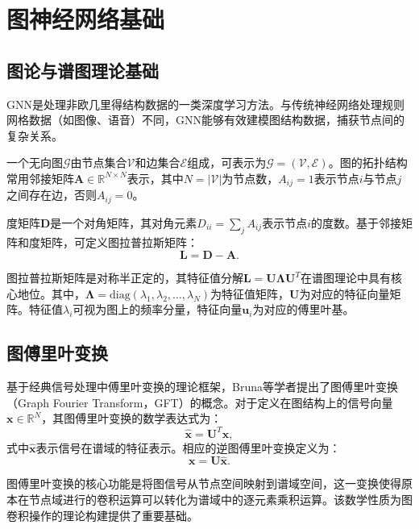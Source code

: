 \section{图神经网络基础}

\subsection{图论与谱图理论基础}

GNN是处理非欧几里得结构数据的一类深度学习方法。与传统神经网络处理规则网格数据（如图像、语音）不同，GNN能够有效建模图结构数据，捕获节点间的复杂关系\cite{chaptertwo6}。

一个无向图$\mathcal{G}$由节点集合$\mathcal{V}$和边集合$\mathcal{E}$组成，可表示为$\mathcal{G} = (\mathcal{V}, \mathcal{E})$。图的拓扑结构常用邻接矩阵$\mathbf{A} \in \mathbb{R}^{N \times N}$表示，其中$N = |\mathcal{V}|$为节点数，$A_{ij} = 1$表示节点$i$与节点$j$之间存在边，否则$A_{ij} = 0$。

度矩阵$\mathbf{D}$是一个对角矩阵，其对角元素$D_{ii} = \sum_j A_{ij}$表示节点$i$的度数。基于邻接矩阵和度矩阵，可定义图拉普拉斯矩阵\cite{chaptertwo7}：
\begin{equation}
\mathbf{L} = \mathbf{D} - \mathbf{A}.
\end{equation}

图拉普拉斯矩阵是对称半正定的，其特征值分解$\mathbf{L} = \mathbf{U}\boldsymbol{\Lambda}\mathbf{U}^T$在谱图理论中具有核心地位。其中，$\boldsymbol{\Lambda} = \text{diag}(\lambda_1, \lambda_2, \ldots, \lambda_N)$为特征值矩阵，$\mathbf{U}$为对应的特征向量矩阵。特征值$\lambda_i$可视为图上的频率分量，特征向量$\mathbf{u}_i$为对应的傅里叶基。

\subsection{图傅里叶变换}

基于经典信号处理中傅里叶变换的理论框架，Bruna等学者\cite{chaptertwo8}提出了图傅里叶变换（Graph Fourier Transform，GFT）的概念。对于定义在图结构上的信号向量$\mathbf{x} \in \mathbb{R}^N$，其图傅里叶变换的数学表达式为：
\begin{equation}
\hat{\mathbf{x}} = \mathbf{U}^T \mathbf{x},
\end{equation}
式中$\hat{\mathbf{x}}$表示信号在谱域的特征表示。相应的逆图傅里叶变换定义为：
\begin{equation}
\mathbf{x} = \mathbf{U} \hat{\mathbf{x}}.
\end{equation}

图傅里叶变换的核心功能是将图信号从节点空间映射到谱域空间，这一变换使得原本在节点域进行的卷积运算可以转化为谱域中的逐元素乘积运算。该数学性质为图卷积操作的理论构建提供了重要基础\cite{chaptertwo9}。

